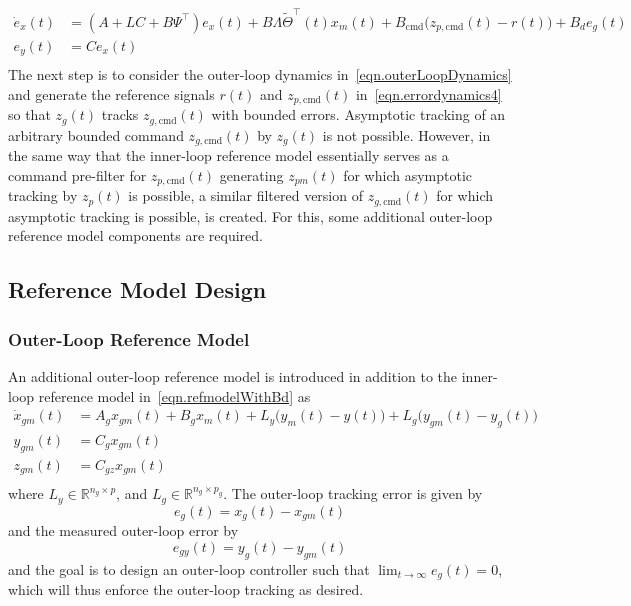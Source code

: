 \begin{equation}
  \label{eqn.errordynamics4}
  \begin{split}
    \dot{e}_{x}(t) &= (A+LC+B\Psi^{\top})e_{x}(t)+B\Lambda\widetilde{\Theta}^{\top}(t)x_{m}(t) + B_{\text{cmd}}\bigr(z_{p,\text{cmd}}(t) - r(t)\bigr) + B_{d}e_{g}(t) \\
    e_{y}(t) &= Ce_{x}(t) \\
  \end{split}
\end{equation}
The next step is to consider the outer-loop dynamics in\ \eqref{eqn.outerLoopDynamics} and generate the reference signals $r(t)$ and $z_{p,\text{cmd}}(t)$ in\ \eqref{eqn.errordynamics4} so that $z_{g}(t)$ tracks $z_{g,\text{cmd}}(t)$ with bounded errors.
Asymptotic tracking of an arbitrary bounded command $z_{g,\text{cmd}}(t)$ by $z_{g}(t)$ is not possible.
However, in the same way that the inner-loop reference model essentially serves as a command pre-filter for $z_{p,\text{cmd}}(t)$ generating $z_{pm}(t)$ for which asymptotic tracking by $z_{p}(t)$ is possible, a similar filtered version of $z_{g,\text{cmd}}(t)$ for which asymptotic tracking is possible, is created.
For this, some additional outer-loop reference model components are required.

\subsection{Reference Model Design}

\subsubsection{Outer-Loop Reference Model}

An additional outer-loop reference model is introduced in addition to the inner-loop reference model in\ \eqref{eqn.refmodelWithBd} as
\begin{equation}
  \label{eqn.refmodelouter}
  \begin{split}
    \dot{x}_{gm}(t) &= A_{g}x_{gm}(t) + B_{g}x_{m}(t) + L_{y}\bigr(y_{m}(t)-y(t)\bigr) + L_{g}\bigr(y_{gm}(t)-y_{g}(t)\bigr) \\
    y_{gm}(t) &= C_{g}x_{gm}(t) \\
    z_{gm}(t) &= C_{gz}x_{gm}(t) \\
  \end{split}
\end{equation}
where $L_{y}\in\mathbb{R}^{n_{g}\times p}$, and $L_{g}\in\mathbb{R}^{n_{g}\times p_{g}}$.
The outer-loop tracking error is given by
\begin{equation*}
  e_{g}(t) = x_{g}(t) - x_{gm}(t)
\end{equation*}
and the measured outer-loop error by
\begin{equation*}
  e_{gy}(t) = y_{g}(t) - y_{gm}(t)
\end{equation*}
and the goal is to design an outer-loop controller such that $\lim_{t\rightarrow\infty}e_{g}(t)=0$, which will thus enforce the outer-loop tracking as desired.

